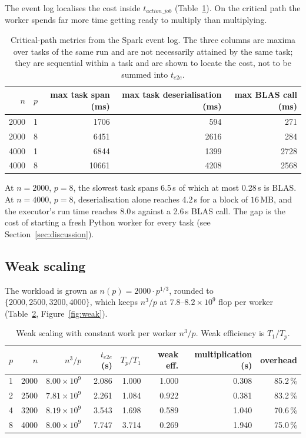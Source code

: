 \documentclass[11pt,a4paper]{article}
\begin{document}
The event log localises the cost inside $t_{action\_job}$
(Table~\ref{tab:task}). On the critical path the worker spends far more
time getting ready to multiply than multiplying.

\begin{table}[h!]
\centering
\small
\setlength{\tabcolsep}{5pt}
\begin{tabular}{rrrrr}
\toprule
$n$ & $p$ & max task span (ms) & max task deserialisation (ms) &
max BLAS call (ms) \\
\midrule
2000 & 1 &  1706 &  594 &  271 \\
2000 & 8 &  6451 & 2616 &  284 \\
4000 & 1 &  6844 & 1399 & 2728 \\
4000 & 8 & 10661 & 4208 & 2568 \\
\bottomrule
\end{tabular}
\caption{Critical-path metrics from the Spark event log. The three
columns are maxima over tasks of the same run and are not necessarily
attained by the same task; they are sequential within a task and are
shown to locate the cost, not to be summed into $t_{e2e}$.}
\label{tab:task}
\end{table}

At $n=2000$, $p=8$, the slowest task spans 6.5\,s of which at most
0.28\,s is BLAS. At $n=4000$, $p=8$, deserialisation alone reaches
4.2\,s for a block of $16$\,MB, and the executor's run time reaches
8.0\,s against a 2.6\,s BLAS call. The gap is the cost of starting a
fresh Python worker for every task (see Section~\ref{sec:discussion}).

\subsection{Weak scaling}

The workload is grown as $n(p) = 2000 \cdot p^{1/3}$, rounded to
$\{2000, 2500, 3200, 4000\}$, which keeps $n^3/p$ at
$7.8$--$8.2 \times 10^9$ flop per worker (Table~\ref{tab:weak},
Figure~\ref{fig:weak}).

\begin{table}[h!]
\centering
\small
\setlength{\tabcolsep}{5pt}
\begin{tabular}{rrrrrrrr}
\toprule
$p$ & $n$ & $n^3/p$ & $t_{e2e}$ (s) & $T_p/T_1$ & weak eff. &
multiplication (s) & overhead \\
\midrule
1 & 2000 & $8.00\times10^9$ & 2.086 & 1.000 & 1.000 & 0.308 & 85.2\,\% \\
2 & 2500 & $7.81\times10^9$ & 2.261 & 1.084 & 0.922 & 0.381 & 83.2\,\% \\
4 & 3200 & $8.19\times10^9$ & 3.543 & 1.698 & 0.589 & 1.040 & 70.6\,\% \\
8 & 4000 & $8.00\times10^9$ & 7.747 & 3.714 & 0.269 & 1.940 & 75.0\,\% \\
\bottomrule
\end{tabular}
\caption{Weak scaling with constant work per worker $n^3/p$. Weak
efficiency is $T_1/T_p$.}
\label{tab:weak}
\end{table}
\end{document}
